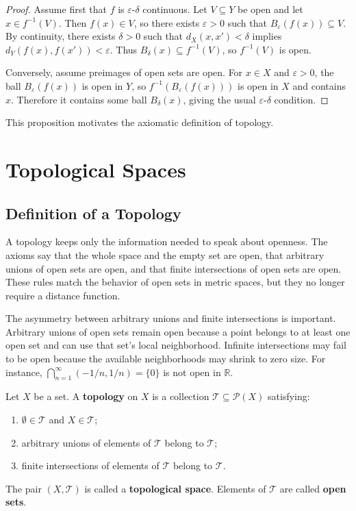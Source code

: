 \begin{proof}
Assume first that $f$ is $\varepsilon$-$\delta$ continuous. Let $V\subseteq Y$ be open and let $x\in f^{-1}(V)$. Then $f(x)\in V$, so there exists $\varepsilon>0$ such that $B_\varepsilon(f(x))\subseteq V$. By continuity, there exists $\delta>0$ such that $d_X(x,x')<\delta$ implies $d_Y(f(x),f(x'))<\varepsilon$. Thus $B_\delta(x)\subseteq f^{-1}(V)$, so $f^{-1}(V)$ is open.

Conversely, assume preimages of open sets are open. For $x\in X$ and $\varepsilon>0$, the ball $B_\varepsilon(f(x))$ is open in $Y$, so $f^{-1}(B_\varepsilon(f(x)))$ is open in $X$ and contains $x$. Therefore it contains some ball $B_\delta(x)$, giving the usual $\varepsilon$-$\delta$ condition.
\end{proof}

This proposition motivates the axiomatic definition of topology.

\section{Topological Spaces}

\subsection{Definition of a Topology}


A topology keeps only the information needed to speak about openness. The axioms say that the whole space and the empty set are open, that arbitrary unions of open sets are open, and that finite intersections of open sets are open. These rules match the behavior of open sets in metric spaces, but they no longer require a distance function.

The asymmetry between arbitrary unions and finite intersections is important. Arbitrary unions of open sets remain open because a point belongs to at least one open set and can use that set's local neighborhood. Infinite intersections may fail to be open because the available neighborhoods may shrink to zero size. For instance, $\bigcap_{n=1}^{\infty}(-1/n,1/n)=\{0\}$ is not open in $\mathbb{R}$.

\begin{definition}[Topology]
Let $X$ be a set. A \textbf{topology} on $X$ is a collection $\mathcal{T}\subseteq\mathcal{P}(X)$ satisfying:
\begin{enumerate}
    \item $\emptyset\in\mathcal{T}$ and $X\in\mathcal{T}$;
    \item arbitrary unions of elements of $\mathcal{T}$ belong to $\mathcal{T}$;
    \item finite intersections of elements of $\mathcal{T}$ belong to $\mathcal{T}$.
\end{enumerate}
The pair $(X,\mathcal{T})$ is called a \textbf{topological space}. Elements of $\mathcal{T}$ are called \textbf{open sets}.
\end{definition}

